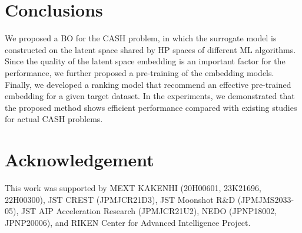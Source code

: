 \section{Conclusions}
\label{sec:conclusion}

We proposed a BO for the CASH problem, in which the surrogate model is constructed on the latent space shared by HP spaces of different ML algorithms. 
%
Since the quality of the latent space embedding is an important factor for the performance, we further proposed a pre-training of the embedding models.
%
Finally, we developed a ranking model that recommend an effective pre-trained embedding for a given target dataset.
%
In the experiments, we demonstrated that the proposed method shows efficient performance compared with existing studies for actual CASH problems.
%


\makeatletter
\ifdefined\KDD \if@ACM@review
\else
\section*{Acknowledgement}
This work was supported by MEXT KAKENHI (20H00601, 23K21696, 22H00300), JST CREST (JPMJCR21D3), JST Moonshot R\&D (JPMJMS2033-05), JST AIP Acceleration Research (JPMJCR21U2), NEDO (JPNP18002, JPNP20006), and RIKEN Center for Advanced Intelligence Project. 
\fi
\makeatother


% 




\appendix


